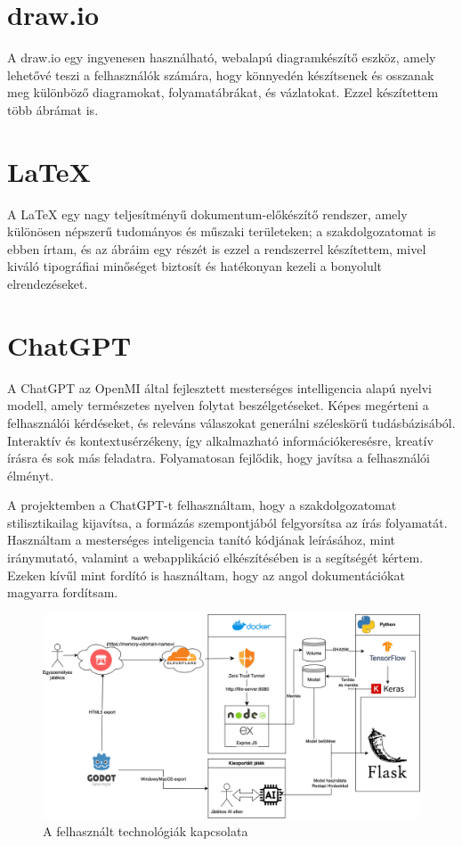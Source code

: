 \section{draw.io}
A draw.io \cite{Aboutdra31:online} egy ingyenesen használható, webalapú diagramkészítő eszköz, amely lehetővé teszi a felhasználók számára, hogy könnyedén készítsenek és osszanak meg különböző diagramokat, folyamatábrákat, és vázlatokat. Ezzel készítettem több ábrámat is. 

\section{LaTeX}
A LaTeX egy nagy teljesítményű dokumentum-előkészítő rendszer, amely különösen népszerű tudományos és műszaki területeken; a szakdolgozatomat is ebben írtam, és az ábráim egy részét is ezzel a rendszerrel készítettem, mivel kiváló tipográfiai minőséget biztosít és hatékonyan kezeli a bonyolult elrendezéseket.

\section{ChatGPT}
A ChatGPT \cite{Introduc55:online} az OpenMI által fejlesztett mesterséges intelligencia alapú nyelvi modell, amely természetes nyelven folytat beszélgetéseket. Képes megérteni a felhasználói kérdéseket, és releváns válaszokat generálni széleskörű tudásbázisából. Interaktív és kontextusérzékeny, így alkalmazható információkeresésre, kreatív írásra és sok más feladatra. Folyamatosan fejlődik, hogy javítsa a felhasználói élményt.

A projektemben a ChatGPT-t felhasználtam, hogy a szakdolgozatomat stilisztikailag kijavítsa, a formázás szempontjából felgyorsítsa az írás folyamatát. Használtam a mesterséges inteligencia tanító kódjának leírásához, mint iránymutató, valamint a webapplikáció elkészítésében is a segítségét kértem. Ezeken kívűl mint fordító is használtam, hogy az angol dokumentációkat magyarra fordítsam. 
\begin{figure}[h]
    \center
    \includegraphics[width=\textwidth]{img/fullfolyamat.png}
    \caption{A felhasznált technológiák kapcsolata}
    \label{img:technology}
\end{figure}